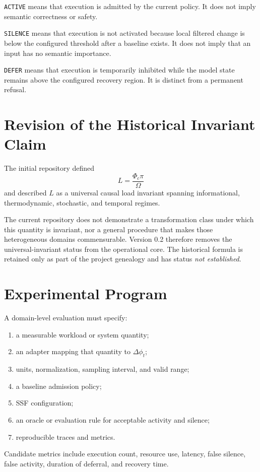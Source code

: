 \documentclass[11pt]{article}
\begin{document}
\texttt{ACTIVE} means that execution is admitted by the current policy. It
does not imply semantic correctness or safety.

\texttt{SILENCE} means that execution is not activated because local filtered
change is below the configured threshold after a baseline exists. It does not
imply that an input has no semantic importance.

\texttt{DEFER} means that execution is temporarily inhibited while the model
state remains above the configured recovery region. It is distinct from a
permanent refusal.

\section{Revision of the Historical Invariant Claim}

The initial repository defined
\[
L=\frac{\Phi_c\pi}{\Omega}
\]
and described $L$ as a universal causal load invariant spanning informational,
thermodynamic, stochastic, and temporal regimes.

The current repository does not demonstrate a transformation class under
which this quantity is invariant, nor a general procedure that makes those
heterogeneous domains commensurable. Version 0.2 therefore removes the
universal-invariant status from the operational core. The historical formula
is retained only as part of the project genealogy and has status
\emph{not established}.

\section{Experimental Program}

A domain-level evaluation must specify:
\begin{enumerate}
\item a measurable workload or system quantity;
\item an adapter mapping that quantity to $\Delta\phi_t$;
\item units, normalization, sampling interval, and valid range;
\item a baseline admission policy;
\item SSF configuration;
\item an oracle or evaluation rule for acceptable activity and silence;
\item reproducible traces and metrics.
\end{enumerate}

Candidate metrics include execution count, resource use, latency, false
silence, false activity, duration of deferral, and recovery time.
\end{document}
